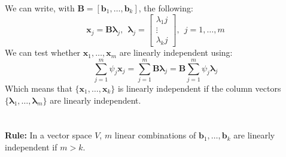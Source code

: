 \documentclass[12pt]{article}
\newcommand{\bx}{{\bm{x}}}
\newcommand{\B}{{\bm{B}}}
\newcommand{\vecs}[2]{{\bm{#1}_1, \dots, \bm{#1}_#2}}
\begin{document}
%
We can write, with $\B = [\bm{b}_1, \dots, \bm{b}_k]$, the following:
%
\begin{equation}
	\bx_j = \bm{B} \bm{\lambda}_j, \ \ \bm{\lambda}_j = \begin{bmatrix}
		\lambda_1j \\
		\vdots \\
		\lambda_kj
	\end{bmatrix}, \ \ j = 1, \dots,m 
\end{equation}
%
We can test whether $\bx_1, \dots, \bx_m$ are linearly independent using:
\begin{equation}
	\sum\limits_{j=1}^m \psi_j \bx_j = \sum\limits_{j=1}^m \B\bm{\lambda}_j = \B \sum\limits_{j=1}^m \psi_j \bm{\lambda}_j
\end{equation}
%
Which means that $\{\vecs{x}{k}\}$ is linearly independent if the column vectors $\{\vecs{\lambda}{m}\}$ are linearly independent.
%
\\
\\
\\
%
\colorbox{red!30}{\textbf{Rule:}} In a vector space $V$, $m$ linear combinations of $\vecs{b}{k}$ are linearly independent if $m > k$. 
\end{document}
